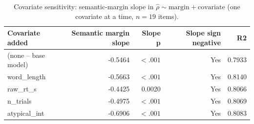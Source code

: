 \begin{table}[htbp]
\centering
\caption{Covariate sensitivity: semantic-margin slope in $\hat{\rho} \sim \mathrm{margin} + \mathrm{covariate}$ (one covariate at a time, $n=19$ items).}
\label{tab:covariate-sensitivity}
\begin{tabular}{lrrrr}
\toprule
Covariate added & Semantic margin slope & Slope p & Slope sign negative & R2 \\
\midrule
(none – base model) & -0.5464 & $<.001$ & Yes & 0.7933 \\
word\_length & -0.5663 & $<.001$ & Yes & 0.8140 \\
raw\_rt\_s & -0.4425 & 0.0020 & Yes & 0.8066 \\
n\_trials & -0.4975 & $<.001$ & Yes & 0.8069 \\
atypical\_int & -0.6906 & $<.001$ & Yes & 0.8083 \\
\bottomrule
\end{tabular}
\end{table}
